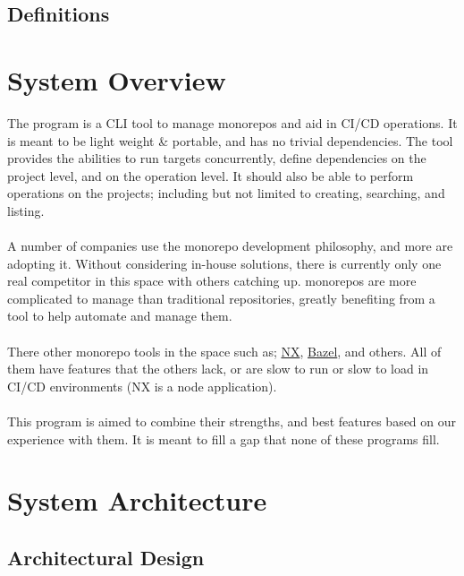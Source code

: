 \documentclass[11pt]{article}
\begin{document}
\subsection{Definitions}

\printglossary[title=\normalsize\vspace*{-1.5\baselineskip}, toctitle=]
\section{System Overview}

The program is a \Gls{CLI} tool to manage \glspl{monorepo} and aid in
\gls{CI/CD} operations. It is meant to be light weight \& portable, and has no
trivial dependencies. The tool provides the abilities to run \glspl{target}
concurrently, define dependencies on the project level, and on the operation
level. It should also be able to perform operations on the projects; including
but not limited to creating, searching, and listing.
\\\\
A number of companies use the \gls{monorepo} development philosophy, and more
are adopting it. Without considering in-house solutions, there is currently only
one real competitor in this space with others catching up. \Glspl{monorepo} are
more complicated to manage than traditional repositories, greatly benefiting
from a tool to help automate and manage them.
\\\\
There other \gls{monorepo} tools in the space such
as; \href{https://nx.dev/}{NX}, \href{https://bazel.build/}{Bazel}, and others.
All of them have features that the others lack, or are slow to run or slow to
load in \gls{CI/CD} environments (NX is a node application).
\\\\
This program is aimed to combine their strengths, and best features based on our
experience with them. It is meant to fill a gap that none of these programs fill.

\section{System Architecture}

\subsection{Architectural Design}
\end{document}
